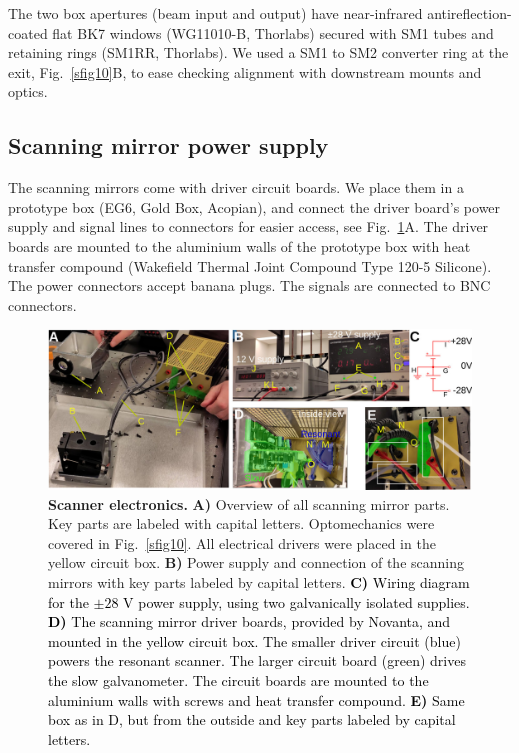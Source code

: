 \documentclass[10pt,letterpaper]{article}
\begin{document}
The two box apertures (beam input and output) have near-infrared antireflection-coated flat BK7 windows (WG11010-B, Thorlabs) secured with SM1 tubes and retaining rings (SM1RR, Thorlabs). We used a SM1 to SM2 converter ring at the exit, Fig.~\ref{sfig10}B, to ease checking alignment with downstream mounts and optics.

\subsection{Scanning mirror power supply}
%
The scanning mirrors come with driver circuit boards. We place them in a prototype box (EG6, Gold Box, Acopian), and connect the driver board's power supply and signal lines to connectors for easier access, see Fig.~\ref{sfig11}A. The driver boards are mounted to the aluminium walls of the prototype box with heat transfer compound (Wakefield Thermal Joint Compound Type 120-5 Silicone). The power connectors accept banana plugs. The signals are connected to BNC connectors. 
%
\begin{figure}[t]
    \includegraphics[width=\textwidth]{sfig11.jpg}
  \caption{{\bf Scanner electronics.} \textbf{A)} Overview of all scanning mirror parts. Key parts are labeled with capital letters. Optomechanics were covered in Fig.~\ref{sfig10}. All electrical drivers were placed in the yellow circuit box. \textbf{B)} Power supply and connection of the scanning mirrors with key parts labeled by capital letters. \textcolor{black}{\textbf{C)} Wiring diagram for the $\pm 28\text{ V}$ power supply, using two galvanically isolated supplies. \textbf{D)} The scanning mirror driver boards, provided by Novanta, and mounted in the yellow circuit box. The smaller driver circuit (blue) powers the resonant scanner. The larger circuit board (green) drives the slow galvanometer. The circuit boards are mounted to the aluminium walls with screws and heat transfer compound. \textbf{E)} Same box as in D, but from the outside and key parts labeled by capital letters.}}
  \label{sfig11}
\end{figure}
\end{document}
